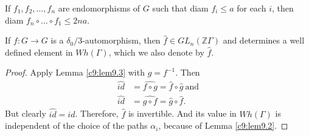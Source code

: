 \begin{remark*}
  If $f_1, f_2, \ldots , f_n$ are endomorphisms of $G$ such that diam
  $f_i \leq a$ for each $i$, then diam $f_n \circ \ldots \circ f_1\leq
  2 na$.
\end{remark*}

\begin{coro}\label{c9:coro9.4}
  If $f: G \to G$ is a $\delta_0/3$-automorphism, then $\hat{f} \in
  GL_n (\mathbb{Z}\Gamma)$ and determines a well defined element
  in $Wh (\Gamma)$, which we also denote by $\hat{f}$.
\end{coro}

\begin{proof}
  Apply Lemma \ref{c9:lem9.3} with $g = f^{-1}$. Then
  \begin{align*}
    \widehat{id} & = \widehat{f \circ g} = \hat{f} \circ
    \hat{g} ~\text{and}\\
    \widehat{id} & = \widehat{g \circ f} = \hat{g} \circ \hat{f}.
  \end{align*}
  But clearly $\widehat{id} = id$. Therefore, $\hat{f}$ is
  invertible. And its value in $Wh(\Gamma)$ is independent of the
  choice of the paths $\alpha_i$, because of Lemma \ref{c9:lem9.2}.
\end{proof}
